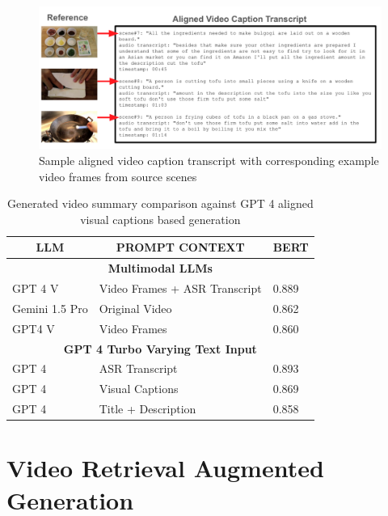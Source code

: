 \documentclass[sigconf]{acmart}
\begin{document}
\begin{CCSXML}
		\begin{figure}
			\centering
			\includegraphics[width=\dimexpr\textwidth-2\fboxrule-2\fboxsep]{transcript}%
			\caption{Sample aligned video caption transcript with corresponding example video frames from source scenes}
			\label{fig:transcript}
		\end{figure}
		
		\begin{table}
			\begin{center}
				\begin{tabular}{ l l l }
					\toprule
					\multicolumn{1}{c}{\bf LLM}  &\multicolumn{1}{c}{\bf PROMPT CONTEXT} &\multicolumn{1}{c}{\bf BERT}\\
					\hline
					\multicolumn{3}{c}{\textbf{Multimodal LLMs}} \\
					\midrule
					GPT 4 V	& Video Frames + ASR Transcript	&0.889 \\
					Gemini 1.5 Pro	& Original Video	&0.862 \\
					GPT4 V & Video Frames &0.860 \\
					\midrule		
					\multicolumn{3}{c}{\textbf{GPT 4 Turbo Varying Text Input}} \\
					\midrule
					GPT 4	& ASR Transcript	&0.893 \\
					GPT 4	& Visual Captions	&0.869 \\
					GPT 4	& Title + Description	&0.858 \\
					\bottomrule
				\end{tabular}
			\end{center}
			\caption{Generated video summary comparison against GPT 4 aligned visual captions based generation}
			\label{tab:summarization}
		\end{table}
		
		\section{Video Retrieval Augmented Generation}
		\label{sec:science}
		

\end{CCSXML}
\end{document}
